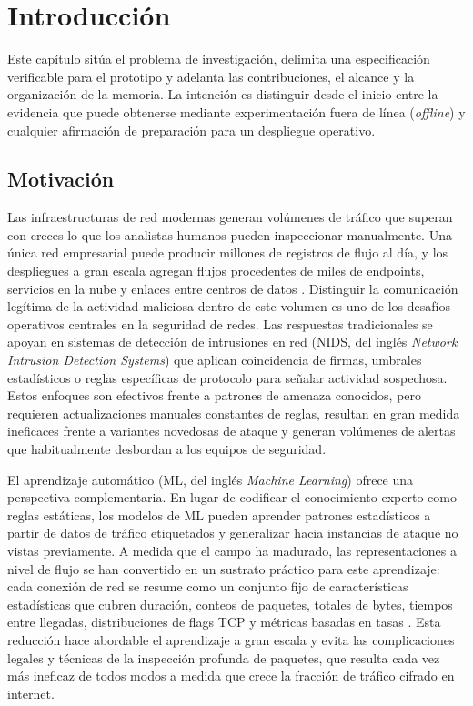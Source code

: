 \chapter{Introducción}

Este capítulo sitúa el problema de investigación, delimita una especificación verificable para el prototipo y adelanta las contribuciones, el alcance y la organización de la memoria. La intención es distinguir desde el inicio entre la evidencia que puede obtenerse mediante experimentación fuera de línea (\emph{offline}) y cualquier afirmación de preparación para un despliegue operativo.

\section{Motivación}
Las infraestructuras de red modernas generan volúmenes de tráfico que superan con creces lo que los analistas humanos pueden inspeccionar manualmente. Una única red empresarial puede producir millones de registros de flujo al día, y los despliegues a gran escala agregan flujos procedentes de miles de endpoints, servicios en la nube y enlaces entre centros de datos \parencite{ScarfoneMell2007}. Distinguir la comunicación legítima de la actividad maliciosa dentro de este volumen es uno de los desafíos operativos centrales en la seguridad de redes. Las respuestas tradicionales se apoyan en sistemas de detección de intrusiones en red (NIDS, del inglés \emph{Network Intrusion Detection Systems}) que aplican coincidencia de firmas, umbrales estadísticos o reglas específicas de protocolo para señalar actividad sospechosa. Estos enfoques son efectivos frente a patrones de amenaza conocidos, pero requieren actualizaciones manuales constantes de reglas, resultan en gran medida ineficaces frente a variantes novedosas de ataque y generan volúmenes de alertas que habitualmente desbordan a los equipos de seguridad.

El aprendizaje automático (ML, del inglés \emph{Machine Learning}) ofrece una perspectiva complementaria. En lugar de codificar el conocimiento experto como reglas estáticas, los modelos de ML pueden aprender patrones estadísticos a partir de datos de tráfico etiquetados y generalizar hacia instancias de ataque no vistas previamente. A medida que el campo ha madurado, las representaciones a nivel de flujo se han convertido en un sustrato práctico para este aprendizaje: cada conexión de red se resume como un conjunto fijo de características estadísticas que cubren duración, conteos de paquetes, totales de bytes, tiempos entre llegadas, distribuciones de flags TCP y métricas basadas en tasas \parencite{Sperotto2010FlowIDS,Umer2017FlowIDS}. Esta reducción hace abordable el aprendizaje a gran escala y evita las complicaciones legales y técnicas de la inspección profunda de paquetes, que resulta cada vez más ineficaz de todos modos a medida que crece la fracción de tráfico cifrado en internet.

